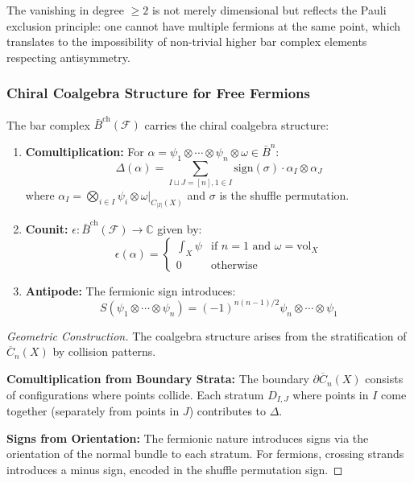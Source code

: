 \begin{remark}
The vanishing in degree $\geq 2$ is not merely dimensional but reflects the Pauli exclusion principle: one cannot have multiple fermions at the same point, which translates to the impossibility of non-trivial higher bar complex elements respecting antisymmetry.
\end{remark}

 
\subsubsection{Chiral Coalgebra Structure for Free Fermions}

\begin{theorem}\label{thm:fermion-bar-coalg}
The bar complex $\bar{B}^{\text{ch}}(\mathcal{F})$ carries the chiral coalgebra structure:
\begin{enumerate}
\item \textbf{Comultiplication:} For $\alpha = \psi_1 \otimes \cdots \otimes \psi_n \otimes \omega \in \bar{B}^n$:
\[
\Delta(\alpha) = \sum_{I \sqcup J = [n], 1 \in I} \text{sign}(\sigma) \cdot \alpha_I \otimes \alpha_J
\]
where $\alpha_I = \bigotimes_{i \in I} \psi_i \otimes \omega|_{C_{|I|}(X)}$ and $\sigma$ is the shuffle permutation.

\item \textbf{Counit:} $\epsilon: \bar{B}^{\text{ch}}(\mathcal{F}) \to \mathbb{C}$ given by:
\[
\epsilon(\alpha) = \begin{cases}
\int_X \psi & \text{if } n = 1 \text{ and } \omega = \text{vol}_X \\
0 & \text{otherwise}
\end{cases}
\]

\item \textbf{Antipode:} The fermionic sign introduces:
\[
S(\psi_1 \otimes \cdots \otimes \psi_n) = (-1)^{n(n-1)/2} \psi_n \otimes \cdots \otimes \psi_1
\]
\end{enumerate}
\end{theorem}

\begin{proof}[Geometric Construction]
The coalgebra structure arises from the stratification of $\overline{C}_n(X)$ by collision patterns.

\textbf{Comultiplication from Boundary Strata:} The boundary $\partial\overline{C}_n(X)$ consists of 
configurations where points collide. Each stratum $D_{I,J}$ where points in $I$ come together 
(separately from points in $J$) contributes to $\Delta$.

\textbf{Signs from Orientation:} The fermionic nature introduces signs via the orientation of 
the normal bundle to each stratum. For fermions, crossing strands introduces a minus sign, 
encoded in the shuffle permutation sign.
\end{proof}

